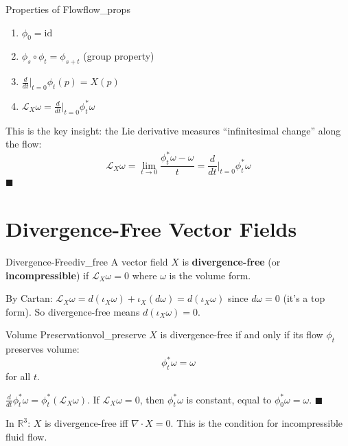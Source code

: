 \documentclass[11pt, letterpaper, openany]{book}
\renewenvironment{proof}[1][\proofname]{%
  \tcolorbox[blanker, breakable, left=1em,
    before skip=1em, after skip=1em,
    borderline west={2pt}{0pt}{MagicTeal!50},
    colback=MagicCream,
    before upper={\textcolor{MagicTeal}{\sffamily\bfseries #1.}\space}
  ]%
}{%
  \hfill\textcolor{MagicTeal}{\ensuremath{\blacksquare}}\endtcolorbox%
}
\begin{document}
\begin{thm}{Properties of Flow}{flow_props}
\begin{enumerate}
    \item $\phi_0 = \text{id}$
    \item $\phi_s \circ \phi_t = \phi_{s+t}$ (group property)
    \item $\frac{d}{dt}\big|_{t=0} \phi_t(p) = X(p)$
    \item $\mathcal{L}_X \omega = \frac{d}{dt}\big|_{t=0} \phi_t^* \omega$
\end{enumerate}
\end{thm}

\begin{proof}[Sketch of (4)]
This is the key insight: the Lie derivative measures ``infinitesimal change'' along the flow:
\[\mathcal{L}_X \omega = \lim_{t \to 0} \frac{\phi_t^* \omega - \omega}{t} = \frac{d}{dt}\Big|_{t=0} \phi_t^* \omega\]
\end{proof}

\section{Divergence-Free Vector Fields}

\begin{defn}{Divergence-Free}{div_free}
A vector field $X$ is \textbf{divergence-free} (or \textbf{incompressible}) if $\mathcal{L}_X \omega = 0$ where $\omega$ is the volume form.

By Cartan: $\mathcal{L}_X \omega = d(\iota_X \omega) + \iota_X(d\omega) = d(\iota_X \omega)$ since $d\omega = 0$ (it's a top form). So divergence-free means $d(\iota_X \omega) = 0$.
\end{defn}

\begin{thm}{Volume Preservation}{vol_preserve}
$X$ is divergence-free if and only if its flow $\phi_t$ preserves volume:
\[\phi_t^* \omega = \omega\]
for all $t$.
\end{thm}

\begin{proof}
$\frac{d}{dt} \phi_t^* \omega = \phi_t^* (\mathcal{L}_X \omega)$. If $\mathcal{L}_X \omega = 0$, then $\phi_t^* \omega$ is constant, equal to $\phi_0^* \omega = \omega$.
\end{proof}

\begin{remark}
In $\mathbb{R}^3$: $X$ is divergence-free iff $\nabla \cdot X = 0$. This is the condition for incompressible fluid flow.
\end{remark}
\end{document}

